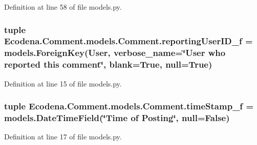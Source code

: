 Definition at line 58 of file models.py.

\hypertarget{class_ecodena_1_1_comment_1_1models_1_1_comment_a8eec9726cc1a3667ec0808b1678ce93e}{
\subsubsection[{reportingUserID\_\-f}]{\setlength{\rightskip}{0pt plus 5cm}tuple {\bf Ecodena.Comment.models.Comment.reportingUserID\_\-f} = models.ForeignKey(User, verbose\_\-name=\char`\"{}User who reported this comment\char`\"{}, blank=True, null=True)}}
\label{d9/d86/class_ecodena_1_1_comment_1_1models_1_1_comment_a8eec9726cc1a3667ec0808b1678ce93e}


Definition at line 15 of file models.py.

\hypertarget{class_ecodena_1_1_comment_1_1models_1_1_comment_aaaea3223dc455aa4dd3de1e74581e88e}{
\subsubsection[{timeStamp\_\-f}]{\setlength{\rightskip}{0pt plus 5cm}tuple {\bf Ecodena.Comment.models.Comment.timeStamp\_\-f} = models.DateTimeField(\char`\"{}Time of Posting\char`\"{}, null=False)}}
\label{d9/d86/class_ecodena_1_1_comment_1_1models_1_1_comment_aaaea3223dc455aa4dd3de1e74581e88e}


Definition at line 17 of file models.py.

\hypertarget{class_ecodena_1_1_comment_1_1models_1_1_comment_a48f0a7161209f9fca70c75637384c6b6}{
\subsubsection[{timeStamp\_\-f}]{}}
\label{d9/d86/class_ecodena_1_1_comment_1_1models_1_1_comment_a48f0a7161209f9fca70c75637384c6b6}


